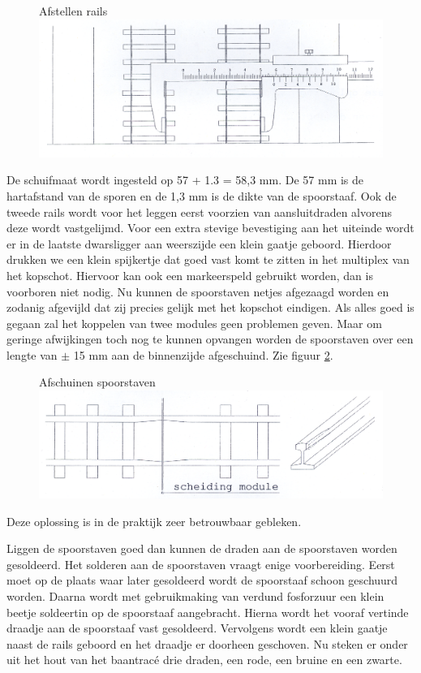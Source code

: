 \documentclass[12pt,a4paper]{report}
\newcommand*{\trace}{trac\'{e} }
\begin{document}
\begin{figure}[ht]
  \captionbox
  {Afstellen rails\label{figuur5}}
  {\includegraphics[scale=1.0]{images/rcu_figuur5}}
\end{figure}

De schuifmaat wordt ingesteld op 57 + 1.3 = 58,3 mm. De 57 mm is de hartafstand van de sporen en de 1,3 mm is de dikte van de spoorstaaf.
Ook de tweede rails wordt voor het leggen eerst voorzien van aansluitdraden alvorens deze wordt vastgelijmd.
Voor een extra stevige bevestiging aan het uiteinde wordt er in de laatste dwarsligger aan weerszijde een klein gaatje geboord. Hierdoor drukken we een klein spijkertje dat goed vast komt te zitten in het multiplex van het kopschot. Hiervoor kan ook een markeerspeld gebruikt worden, dan is voorboren niet nodig. Nu kunnen de spoorstaven netjes afgezaagd worden en zodanig afgevijld dat zij precies gelijk met het kopschot eindigen. Als alles goed is gegaan zal het koppelen van twee modules geen problemen geven. Maar om geringe afwijkingen toch nog te kunnen opvangen worden de spoorstaven over een lengte van $\pm$ 15 mm aan de binnenzijde afgeschuind. Zie figuur \ref{figuur6}.

\begin{figure}[ht]
  \captionbox
  {Afschuinen spoorstaven\label{figuur6}}
  {\includegraphics[scale=1.0]{images/rcu_figuur6}}
\end{figure}

Deze oplossing is in de praktijk zeer betrouwbaar gebleken.

Liggen de spoorstaven goed dan kunnen de draden aan de spoorstaven worden gesoldeerd. Het solderen aan de spoorstaven vraagt enige voorbereiding. Eerst moet op de plaats waar later gesoldeerd wordt de spoorstaaf schoon geschuurd worden. Daarna wordt met gebruikmaking van verdund fosforzuur een klein beetje soldeertin op de spoorstaaf aangebracht. Hierna wordt het vooraf vertinde draadje aan de spoorstaaf vast gesoldeerd. Vervolgens wordt een klein gaatje naast de rails geboord en het draadje er doorheen geschoven. Nu steken er onder uit het hout van het baan\trace drie draden, een rode, een bruine en een zwarte.
\end{document}
